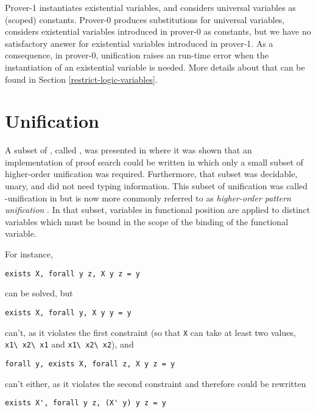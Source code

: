 Prover-1 instantiates existential variables, and considers universal
variables as (scoped) constants. Prover-0 produces substitutions for
universal variables, considers existential variables introduced in
prover-0 as constants, but we have no satisfactory answer for
existential variables introduced in prover-1.  As a consequence, in
prover-0, unification raises an run-time error when the instantiation of
an existential variable is needed.  More details about that can be found
in Section \ref{restrict-logic-variables}.


\section{Unification}
\label{unification}

A subset of \lp{}, called \Ll{}, was presented in \cite{miller91jlc}
where it was shown that an implementation of proof search could be
written in which only a small subset of higher-order unification was
required.  Furthermore, that subset was decidable, unary, and did not
need typing information.  This subset of unification was called
\Ll{}-unification in \cite{miller91jlc} but is now more commonly
referred to as \emph{higher-order pattern unification}
\cite{nipkow93lics,nadathur05iclp}.  In that subset, variables in
functional position are applied to distinct variables which must be
bound in the scope of the binding of the functional variable.

For instance,
\begin{center}
  \lstinline{exists X, forall y z, X y z = y}
\end{center}
can be solved, but
\begin{center}
  \lstinline{exists X, forall y, X y y = y}
\end{center}
can't, as it violates the first constraint (so that \lstinline{X} can
take at least two values, \lstinline{x1\ x2\ x1} and
\lstinline{x1\ x2\ x2}), and
\begin{center}
  \lstinline{forall y, exists X, forall z, X y z = y}
\end{center}
can't either, as it violates the second constraint and therefore could
be rewritten
\begin{center}
  \lstinline{exists X', forall y z, (X' y) y z = y}
\end{center}

